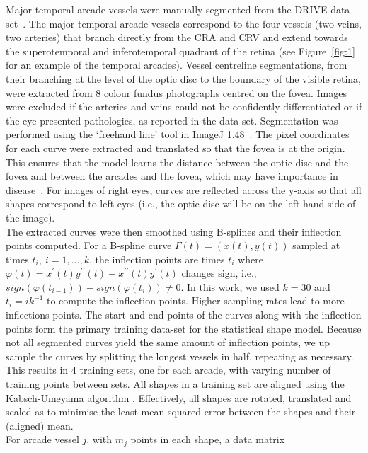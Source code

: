 \documentclass[11pt,]{article}
\begin{document}
Major temporal arcade vessels were manually segmented from the DRIVE data-set~\cite{Staal_2004}.
The major temporal arcade vessels correspond to the four
vessels (two veins, two arteries) that branch directly from the
CRA and CRV and extend towards the superotemporal and inferotemporal quadrant of 
the retina (see Figure~\ref{fig:1} for an example of the temporal
arcades).  Vessel centreline segmentations, from their branching at
the level of the optic disc to the boundary of the visible retina,
were extracted from 8 colour fundus photographs centred on the fovea.
Images were excluded if the arteries and veins could not be
confidently differentiated or if the eye presented pathologies, as
reported in the data-set.  Segmentation was performed using the
`freehand line' tool in ImageJ 1.48~\cite{Schneider2012}.  The pixel
coordinates for each curve were extracted and translated so that the
fovea is at the origin.  This ensures that the model learns the
distance between the optic disc and the fovea and between the arcades
and the fovea, which may have importance in disease~\cite{Arslan2021}.
For images of right eyes, curves are reflected across the y-axis so that all shapes correspond to left eyes (i.e., the optic disc will be on the left-hand side of the image).
\\
The extracted curves were then smoothed using B-splines and their
inflection points computed. For a B-spline curve
$\Gamma(t)=\left(x(t),y(t)\right)$ sampled at times $t_i,\ i=1,…,k$,
the inflection points are times $t_i$ where
$\varphi(t)=x^\prime(t)y^{\prime\prime}(t)-x^{\prime\prime}(t)y^\prime(t)$
changes sign, i.e.,
$sign(\varphi(t_{i-1}))-sign(\varphi(t_i))\neq0$. In this work, we
used $k=30$ and $t_i=i k^{-1}$ to compute the inflection
points. Higher sampling rates lead to more inflections points. The
start and end points of the curves along with the inflection points
form the primary training data-set for the statistical shape
model. Because not all segmented curves yield the same amount of
inflection points, we up sample the curves by splitting the longest
vessels in half, repeating as necessary. This results in 4 training
sets, one for each arcade, with varying number of training points
between sets. All shapes in a training set are aligned using the
Kabsch-Umeyama algorithm \cite{Umeyama1991}. Effectively, all shapes are
rotated, translated and scaled as to minimise the least mean-squared
error between the shapes and their (aligned) mean.
\\
For arcade vessel $j$, with $m_j$ points in each shape, a data matrix
\end{document}
